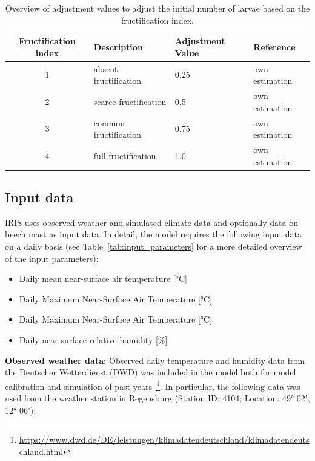 \documentclass[a4paper, 11pt]{scrartcl}
\begin{document}
\begin{table}[h!]
\caption[Overview of beech fructification adjustment values for model initialisation.]{Overview of adjustment values to adjust the initial number of larvae based on the fructification index.}
\label{tab:fructification_adjustment}
\begin{tabularx}{\textwidth}{clll}
\toprule
\textbf{Fructification index} & \textbf{Description}    & \textbf{Adjustment Value} & \textbf{Reference} \\
\midrule
1				 	  		  & absent fructification 	& 	0.25 & own estimation \\
2 				 	  		  & scarce fructification	&	0.5	& own estimation  \\
3 					  		  & common fructification	& 	0.75 & own estimation \\
4					 		  & full fructification 	& 	1.0	& own estimation \\
\bottomrule
\end{tabularx}
\end{table}

\subsection{Input data}\label{input_data}
IRIS uses observed weather and simulated climate data and optionally data on beech mast as input data. In detail, the model requires the following input data on a daily basis (see Table~\ref{tab:input_parameters} for a more detailed overview of the input parameters):

\begin{itemize}[noitemsep]
\item Daily mean near-surface air temperature [°C]
\item Daily Maximum Near-Surface Air Temperature [°C]
\item Daily Maximum Near-Surface Air Temperature [°C]
\item Daily near surface relative humidity [\%]
\end{itemize}

\textbf{Observed weather data:} Observed daily temperature and humidity data from the Deutscher Wetterdienst (DWD) was included in the model both for model calibration and simulation of past years~\footnote{\url{https://www.dwd.de/DE/leistungen/klimadatendeutschland/klimadatendeutschland.html}}. In particular, the following data was used from the weather station in Regensburg (Station ID: 4104; Location: 49° 02', 12° 06'):
\end{document}

